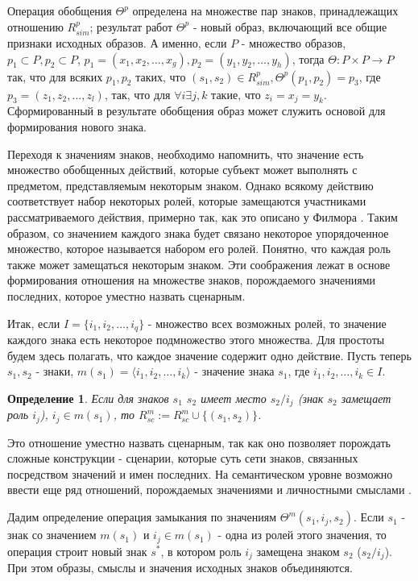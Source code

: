 \documentclass[12pt]{scrartcl}
\newtheorem{definition}{Определение}
\begin{document}
	Операция обобщения $\Theta^p$ определена на множестве пар знаков, принадлежащих отношению $R^p_{sim}$; результат работ $\Theta^p$ - новый образ, включающий все общие признаки исходных образов. А именно, если $P$ - множество образов, $p_1\subset P,p_2\subset P$, $p_1=(x_1,x_2,\dots,x_g), p_2=(y_1,y_2,\dots,y_h)$, тогда $\Theta:P\times P\rightarrow P$ так, что для всяких $p_1,p_2$ таких, что $(s_1,s_2)\in R^p_{sim}, \Theta^p(p_1,p_2)=p_3$, где $p_3=(z_1,z_2,\dots, z_l)$, так, что для $\forall i\exists j,k$ такие, что $z_i=x_j=y_k$. Сформированный в результате обобщения образ может служить основой для формирования нового знака.
	
	Переходя к значениям знаков, необходимо напомнить, что значение есть множество обобщенных действий, которые субъект может выполнять с предметом, представляемым некоторым знаком. Однако всякому действию соответствует набор некоторых ролей, которые замещаются участниками рассматриваемого действия, примерно так, как это описано у Филмора \cite{Fillmore1988}. Таким образом, со значением каждого знака будет связано некоторое упорядоченное множество, которое называется набором его ролей. Понятно, что каждая роль также может замещаться некоторым знаком. Эти соображения лежат в основе формирования отношения на множестве знаков, порождаемого значениями последних, которое уместно назвать сценарным. 
	
	Итак, если $I=\{i_1,i_2,\dots,i_q\}$ - множество всех возможных	ролей, то значение каждого знака есть некоторое подмножество этого множества. Для простоты будем здесь полагать, что каждое значение содержит одно действие. Пусть теперь $s_1, s_2$ - знаки, $m(s_1)=\langle i_1,i_2,\dots,i_k \rangle$ - значение знака $s_1$, где $i_1,i_2,\dots,i_k\in I$.
	
	\begin{definition}
		Если для знаков $s_1$ $s_2$ имеет место $s_2 / i_j$	(знак $s_2$ замещает роль $i_j$), $i_j\in m(s_1)$, то $R^m_{sc}:=R^m_{sc}\cup\{(s_1,s_2)\}$.
	\end{definition}
	
	Это отношение уместно назвать сценарным, так как оно позволяет порождать сложные конструкции -  сценарии, которые суть сети знаков, связанных посредством значений и имен последних. На семантическом уровне возможно ввести еще ряд отношений, порождаемых значениями и личностными смыслами \cite{Osipov2014c}.
	
	Дадим определение операция замыкания по значениям $\Theta^m(s_1,i_j,s_2)$. Если $s_1$ - знак со значением $m(s_1)$ и $i_j\in m(s_1)$ - одна из ролей этого значения, то операция строит новый знак $s^*$, в котором роль $i_j$ замещена знаком $s_2$ ($s_2/i_j$). При этом образы, смыслы и значения исходных знаков объединяются.
	
\end{document}
